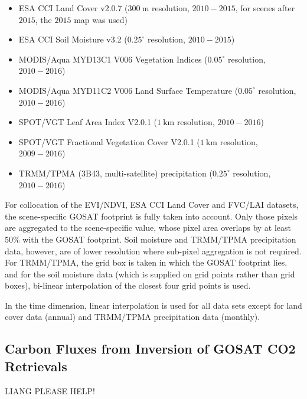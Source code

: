 \documentclass[preprint, a4paper, 10pt, times, 5p]{elsarticle}
\begin{document}
\begin{itemize}
\item ESA CCI Land Cover v2.0.7 ($300\:\mathrm{m}$ resolution, $2010-2015$, for scenes after $2015$, the $2015$ map was used) \citep{Bontemps2013}
\item ESA CCI Soil Moisture v3.2 ($0.25^\circ$ resolution, $2010-2015$) \citep{Dorigo2017}
\item MODIS/Aqua MYD13C1 V006 Vegetation Indices ($0.05^\circ$ resolution, $2010-2016$) \citep{MYD13C1}
\item MODIS/Aqua MYD11C2 V006 Land Surface Temperature ($0.05^\circ$ resolution, $2010-2016$) \citep{MYD11C2}
\item SPOT/VGT Leaf Area Index V2.0.1 ($1\:\mathrm{km}$ resolution, $2010-2016$) \citep{maisongrande2004vegetation}
\item SPOT/VGT Fractional Vegetation Cover V2.0.1 ($1\:\mathrm{km}$ resolution, $2009-2016$) \citep{maisongrande2004vegetation}
\item TRMM/TPMA (3B43, multi-satellite) precipitation ($0.25^\circ$ resolution, $2010-2016$) \citep{huffman2007trmm}
\end{itemize}

For collocation of the EVI/NDVI, ESA CCI Land Cover and FVC/LAI datasets, the scene-specific GOSAT footprint is fully taken into account. Only those pixels are aggregated to the scene-specific value, whose pixel area overlaps by at least $50\%$ with the GOSAT footprint. Soil moisture and TRMM/TPMA precipitation data, however, are of lower resolution where sub-pixel aggregation is not required. For TRMM/TPMA, the grid box is taken in which the GOSAT footprint lies, and for the soil moisture data (which is supplied on grid points rather than grid boxes), bi-linear interpolation of the closest four grid points is used.

In the time dimension, linear interpolation is used for all data sets except for land cover data (annual) and TRMM/TPMA precipitation data (monthly).


\subsection{Carbon Fluxes from Inversion of GOSAT CO2 Retrievals}
\label{sec:fluxes}
LIANG PLEASE HELP!
\end{document}

